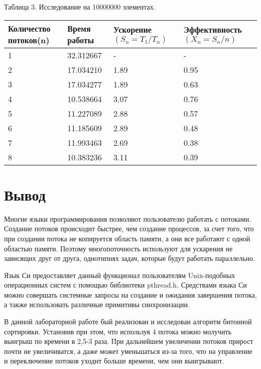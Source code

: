 \documentclass[pdf, unicode, 12pt, a4paper,oneside,fleqn]{article}
\begin{document}
Таблица 3. Исследование на 10000000 элементах.

\begin{tabular}{|p{35mm}|p{35mm}|p{35mm}|p{35mm}|}
    \hline
    {Количество \newline потоков(n)} &Время работы&{Ускорение \newline $(S_n=T_1/T_n)$}&Эффективность $(X_n=S_n/n)$\\
    \hline
    1&32.312667&-&-\\
    \hline
    2&17.034210&1.89&0.95\\
    \hline
    3&17.034277&1.89&0.63\\
    \hline
    4&10.538664&3.07&0.76\\
    \hline
    5&11.227089&2.88&0.57\\
    \hline
    6&11.185609&2.89&0.48\\
    \hline
    7&11.993463&2.69&0.38\\
    \hline
    8&10.383236&3.11&0.39\\
    \hline
\end{tabular}

\pagebreak

\section{Вывод}

Многие языки программирования позволяют пользователю работать с потоками. 
Создание потоков происходит быстрее, чем создание процессов, за счет того, что
при создании потока не копируется область памяти, а они все работают с одной
областью памяти. Поэтому многопоточность используют для ускарения не зависящих
друг от друга, однотипнях задач, которые будут работать параллельно.

Язык Си предоставляет данный функционал пользователям Unix-подобных операционных
систем с помощью библиотеки pthread.h. Средствами языка Си можно совершать системные
запросы на создание и ожидания завершения потока, а также использовать различные
примитивы синхронизации.

В данной лабораторной работе бый реализован и исследован алгоритм битонной сортировки.
Установив при этом, что используя 4 потока можно молучить выигрыш по времени
в 2,5-3 раза. При дальнейшем увеличении потоков прирост почти не увеличиватся, а
даже может уменьшаться из-за того, что на управление и переключение потоков 
уходит больше времени, чем они выигрывают.
\end{document}
